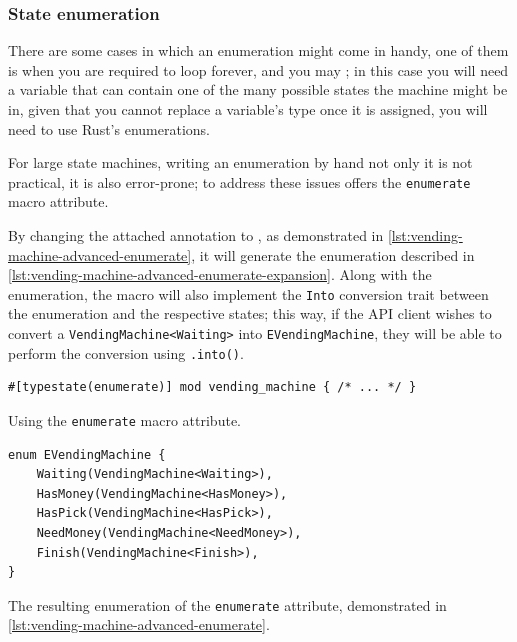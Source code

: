 \subsubsection{State enumeration}

There are some cases in which an enumeration might come in handy,
one of them is when you are required to loop forever,
and you may  ;
in this case you will need a variable that can contain one of the many possible states the machine might be in,
given that you cannot replace a variable's type once it is assigned, you will need to use Rust's enumerations.

For large state machines, writing an enumeration by hand not only it is not practical, it is also error-prone;
to address these issues  offers the \texttt{enumerate} macro attribute.

By changing the attached  annotation to ,
as demonstrated in \autoref{lst:vending-machine-advanced-enumerate},
it will generate the enumeration described in \autoref{lst:vending-machine-advanced-enumerate-expansion}.
Along with the enumeration, the macro will also implement the \texttt{Into} conversion trait between the enumeration and the respective states;
this way, if the API client wishes to convert a \texttt{VendingMachine<Waiting>} into \texttt{EVendingMachine},
they will be able to perform the conversion using \texttt{.into()}.

\begin{listing}
    \begin{verbatim}
#[typestate(enumerate)] mod vending_machine { /* ... */ }
    \end{verbatim}
    \caption{Using the \texttt{enumerate} macro attribute.}
    \label{lst:vending-machine-advanced-enumerate}
\end{listing}

\begin{listing}
    \begin{verbatim}
enum EVendingMachine {
    Waiting(VendingMachine<Waiting>),
    HasMoney(VendingMachine<HasMoney>),
    HasPick(VendingMachine<HasPick>),
    NeedMoney(VendingMachine<NeedMoney>),
    Finish(VendingMachine<Finish>),
}
    \end{verbatim}
    \caption{The resulting enumeration of the \texttt{enumerate} attribute, demonstrated in \autoref{lst:vending-machine-advanced-enumerate}.}
    \label{lst:vending-machine-advanced-enumerate-expansion}
\end{listing}

